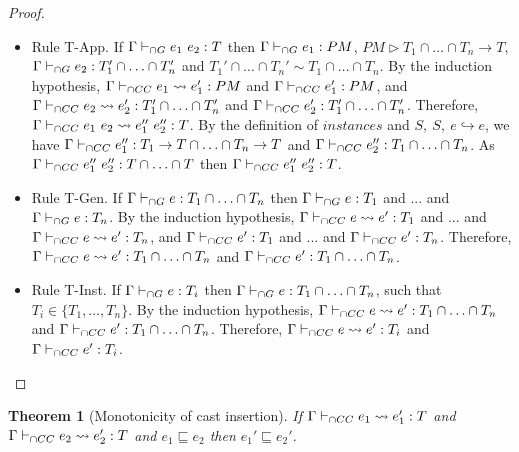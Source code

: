 \documentclass[a4paper]{article}
\newtheorem{theorem}{Theorem}
\begin{document}
\begin{proof}
\begin{itemize}
    \item Rule T-App.
    If $\Gamma \vdash_{\cap G} e_1\ e_2 : T$ then $\Gamma \vdash_{\cap G} e_1 : PM$, $PM \rhd T_1 \cap \ldots \cap T_n \rightarrow T$, $\Gamma \vdash_{\cap G} e_2 : T_1' \cap \ldots \cap T_n'$ and $T_1' \cap \ldots \cap T_n' \sim T_1 \cap \ldots \cap T_n$.
    By the induction hypothesis, $\Gamma \vdash_{\cap CC} e_1 \leadsto e_1' : PM$ and $\Gamma \vdash_{\cap CC} e_1' : PM$, and $\Gamma \vdash_{\cap CC} e_2 \leadsto e_2' : T_1' \cap \ldots \cap T_n'$ and $\Gamma \vdash_{\cap CC} e_2' : T_1' \cap \ldots \cap T_n'$.
    Therefore, $\Gamma \iccts e_1\ e_2 \leadsto e_1''\ e_2'' : T$.
    By the definition of $instances$ and $S,\ S,\ e \hookrightarrow e$, we have $\Gamma \vdash_{\cap CC} e_1'' : T_1 \rightarrow T \cap \ldots \cap T_n \rightarrow T$ and $\Gamma \vdash_{\cap CC} e_2'' : T_1 \cap \ldots \cap T_n$.
    As $\Gamma \vdash_{\cap CC} e_1''\ e_2'' : T \cap \ldots \cap T$ then $\Gamma \vdash_{\cap CC} e_1''\ e_2'' : T$.
    \item Rule T-Gen.
    If $\Gamma \vdash_{\cap G} e : T_1 \cap \ldots \cap T_n$ then $\Gamma \vdash_{\cap G} e : T_1$ and ... and $\Gamma \vdash_{\cap G} e : T_n$.
    By the induction hypothesis, $\Gamma \vdash_{\cap CC} e \leadsto e' : T_1$ and ... and $\Gamma \vdash_{\cap CC} e \leadsto e' : T_n$, and $\Gamma \vdash_{\cap CC} e' : T_1$ and ... and $\Gamma \vdash_{\cap CC} e' : T_n$.
    Therefore, $\Gamma \vdash_{\cap CC} e \leadsto e' : T_1 \cap \ldots \cap T_n$ and $\Gamma \vdash_{\cap CC} e' : T_1 \cap \ldots \cap T_n$.
    \item Rule T-Inst.
    If $\Gamma \vdash_{\cap G} e : T_i$ then $\Gamma \vdash_{\cap G} e : T_1 \cap \ldots \cap T_n$, such that $T_i \in \{T_1, \ldots, T_n\}$.
    By the induction hypothesis, $\Gamma \vdash_{\cap CC} e \leadsto e' : T_1 \cap \ldots \cap T_n$ and $\Gamma \vdash_{\cap CC} e' : T_1 \cap \ldots \cap T_n$.
    Therefore, $\Gamma \vdash_{\cap CC} e \leadsto e' : T_i$ and $\Gamma \vdash_{\cap CC} e' : T_i$.
\end{itemize}
\end{proof}

\begin{theorem}[Monotonicity of cast insertion]
\label{monotonicity_cast_insertion}
If $\Gamma \vdash_{\cap CC} e_1 \leadsto e_1' : T$ and $\Gamma \vdash_{\cap CC} e_2 \leadsto e_2' : T$ and $e_1 \sqsubseteq e_2$ then $e_1' \sqsubseteq e_2'$.
\end{theorem}
\end{document}
